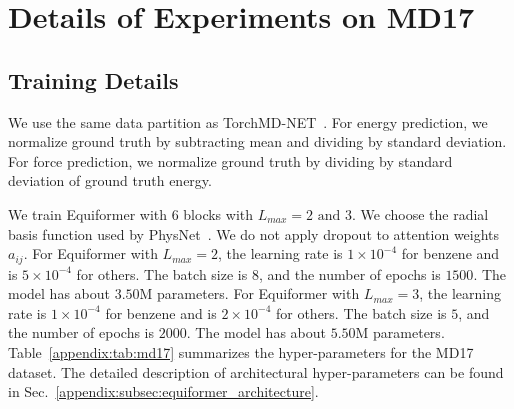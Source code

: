 \section{Details of Experiments on MD17}
\label{appendix:sec:md17}


\subsection{Training Details}
\label{appendix:subsec:md17_training_details}

We use the same data partition as TorchMD-NET~\citep{torchmd_net}.
For energy prediction, we normalize ground truth by subtracting mean and dividing by standard deviation.
For force prediction, we normalize ground truth by dividing by standard deviation of ground truth energy.

We train Equiformer with 6 blocks with $L_{max} = 2 \text{ and } 3$.
We choose the radial basis function used by PhysNet~\citep{physnet}.
We do not apply dropout to attention weights $a_{ij}$.
For Equiformer with $L_{max} = 2$, the learning rate is $1 \times 10 ^{-4}$ for benzene and is $5 \times 10^{-4}$ for others. 
The batch size is $8$, and the number of epochs is $1500$.
The model has about $3.50$M parameters.
For Equiformer with $L_{max} = 3$, the learning rate is $1 \times 10 ^{-4}$ for benzene and is $2 \times 10^{-4}$ for others. 
The batch size is $5$, and the number of epochs is $2000$.
The model has about $5.50$M parameters.
Table~\ref{appendix:tab:md17} summarizes the hyper-parameters for the MD17 dataset.
The detailed description of architectural hyper-parameters can be found in Sec.~\ref{appendix:subsec:equiformer_architecture}. 

